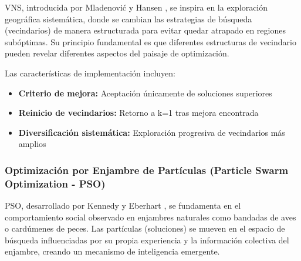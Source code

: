 VNS, introducida por Mladenović y Hansen \cite{mladenovic1997variable}, se inspira en la exploración geográfica sistemática, donde se cambian las estrategias de búsqueda (vecindarios) de manera estructurada para evitar quedar atrapado en regiones subóptimas. Su principio fundamental es que diferentes estructuras de vecindario pueden revelar diferentes aspectos del paisaje de optimización.

\begin{table}[htbp]
\centering
{}
\caption{Configuración de parámetros del algoritmo VNS.}
\label{tab:parametros_vns}
\end{table}

Las características de implementación incluyen:
\begin{itemize}
    \item \textbf{Criterio de mejora:} Aceptación únicamente de soluciones superiores
    \item \textbf{Reinicio de vecindarios:} Retorno a k=1 tras mejora encontrada
    \item \textbf{Diversificación sistemática:} Exploración progresiva de vecindarios más amplios
\end{itemize}

\subsubsection{Optimización por Enjambre de Partículas (Particle Swarm Optimization - PSO)}

PSO, desarrollado por Kennedy y Eberhart \cite{kennedy1995particle}, se fundamenta en el comportamiento social observado en enjambres naturales como bandadas de aves o cardúmenes de peces. Las partículas (soluciones) se mueven en el espacio de búsqueda influenciadas por su propia experiencia y la información colectiva del enjambre, creando un mecanismo de inteligencia emergente.

